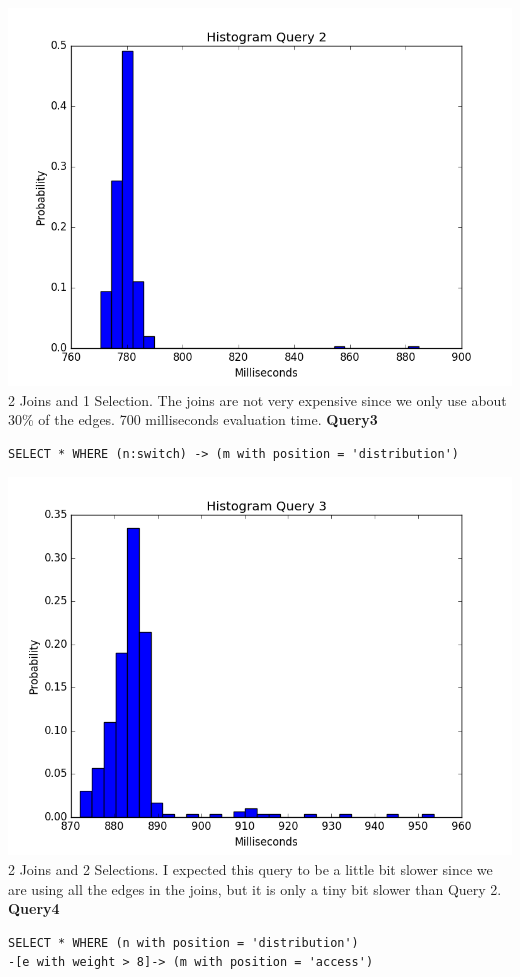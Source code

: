 \documentclass[11pt,singlecolumn]{scrartcl}
\begin{document}
\includegraphics[width=1\textwidth]{q2}
2 Joins and 1 Selection. The joins are not very expensive since we only use about 30\% of the edges. 700 milliseconds evaluation time.
\clearpage
\textbf{Query3}\\
\begin{verbatim}
SELECT * WHERE (n:switch) -> (m with position = 'distribution')\end{verbatim}
\includegraphics[width=1\textwidth]{q3}
2 Joins and 2 Selections. I expected this query to be a little bit slower since we are using all the edges in the joins, but it is only a tiny bit slower than Query 2.
\clearpage
\textbf{Query4}\\
\begin{verbatim}
SELECT * WHERE (n with position = 'distribution')
-[e with weight > 8]-> (m with position = 'access')\end{verbatim}
\end{document}
